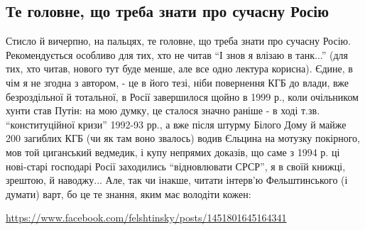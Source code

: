  
 
 
 
 

\subsection{Те головне, що треба знати про сучасну Росію}
\label{sec:12_05_2021.fb.zabuzhko_oksana.1.rossia}

Стисло й вичерпно, на пальцях, те головне, що треба знати про сучасну Росію.
Рекомендується особливо для тих, хто не читав \enquote{І знов я влізаю в танк...} (для
тих, хто читав, нового тут буде менше, але все одно лектура корисна). Єдине, в
чім я не згодна з автором, - це в його тезі, ніби повернення КГБ до влади, вже
безроздільної й тотальної, в Росії завершилося щойно в 1999 р., коли очільником
хунти став Путін: на мою думку, це сталося значно раніше - в ході т.зв.
\enquote{конституційної кризи} 1992-93 рр., а вже після штурму Білого Дому й майже 200
загиблих КГБ (чи як там воно звалось) водив Єльцина на мотузку покірного, мов
той циганський ведмедик, і купу непрямих доказів, що саме з 1994 р. ці
нові-старі господарі Росії заходились \enquote{відновлювати СРСР}, я в своїй книжці,
зрештою, й наводжу... Але, так чи інакше, читати інтерв'ю Фельштинського (і
думати) варт, бо це те знання, яким має володіти кожен:

\url{https://www.facebook.com/felshtinsky/posts/1451801645164341}
